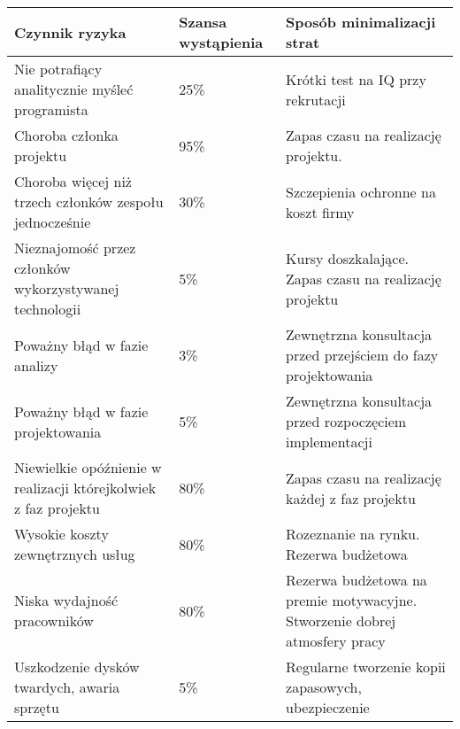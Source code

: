\documentclass[11pt,leqno]{article}
\begin{document}
\begin{center}
 \begin{tabular}{|p{6cm}|p{1.3cm}|p{6cm}|}
  \hline
 Czynnik ryzyka & Szansa wystąpienia & Sposób minimalizacji strat \\ \hline
  Nie potrafiący analitycznie myśleć programista & 25\% & Krótki test na IQ przy rekrutacji \\ \hline
 Choroba członka projektu & 95\% & Zapas czasu na realizację projektu. \\ \hline
 Choroba więcej niż trzech członków zespołu jednocześnie & 30\% & Szczepienia ochronne na koszt firmy \\ \hline
 Nieznajomość przez członków wykorzystywanej technologii & 5\% & Kursy doszkalające. Zapas czasu na realizację projektu \\ \hline
Poważny błąd w fazie analizy & 3\% & Zewnętrzna konsultacja przed przejściem do fazy projektowania \\ \hline
Poważny błąd w fazie projektowania & 5\% & Zewnętrzna konsultacja przed rozpoczęciem implementacji \\ \hline
Niewielkie opóźnienie w realizacji którejkolwiek z faz projektu & 80\% & Zapas czasu na realizację każdej z faz projektu \\ \hline
Wysokie koszty zewnętrznych usług & 80\% & Rozeznanie na rynku. Rezerwa budżetowa \\ \hline
Niska wydajność pracowników & 80\% & Rezerwa budżetowa na premie motywacyjne. Stworzenie dobrej atmosfery pracy \\ \hline
Uszkodzenie dysków twardych, awaria sprzętu & 5\% & Regularne tworzenie kopii zapasowych, ubezpieczenie \\ \hline

 \end{tabular}
\end{center}
\end{document}
